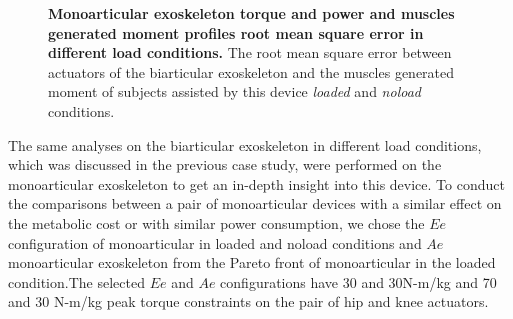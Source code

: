 \documentclass[10pt,letterpaper]{article}
\begin{document}
\begin{figure}[ht!]
	\centering
	\hfil
	\vspace{1mm}
	\caption{\small{\textbf{Monoarticular exoskeleton torque and power and muscles generated moment profiles root mean square error in different load conditions.} The root mean square error between actuators of the biarticular exoskeleton and the muscles generated moment of subjects assisted by this device {\it loaded} and {\it noload} conditions.}}
	\label{Fig_Case04_RMSE}
\end{figure}
The same analyses on the biarticular exoskeleton in different load conditions, which was discussed in the previous case study,  were performed on the monoarticular exoskeleton to get an in-depth insight into this device. To conduct the comparisons between a pair of monoarticular devices with a similar effect on the metabolic cost or with similar power consumption, we chose the $Ee$ configuration of monoarticular in loaded and noload conditions and $Ae$ monoarticular exoskeleton from the Pareto front of monoarticular in the loaded condition.The selected $Ee$ and $Ae$ configurations have 30 and 30N-m/kg and 70 and 30 N-m/kg peak torque constraints on the pair of hip and knee actuators.\\
\end{document}

